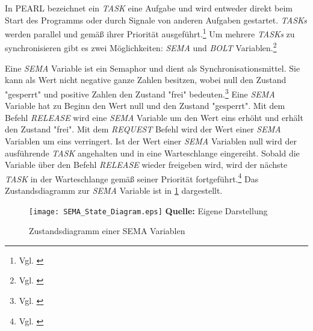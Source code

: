 In PEARL bezeichnet ein \emph{TASK} eine Aufgabe und wird entweder direkt beim
Start des Programms oder durch Signale von anderen Aufgaben gestartet.
\emph{TASKs} werden parallel und gemäß ihrer Priorität ausgeführt.\footnote{Vgl.
\autocite[104]{PEARL}} Um mehrere \emph{TASKs} zu synchronisieren gibt es zwei
Möglichkeiten: \emph{SEMA} und \emph{BOLT} Variablen.\footnote{Vgl.
\autocite[120]{PEARL}}

Eine \emph{SEMA} Variable ist ein Semaphor und dient als Synchronisationsmittel.
Sie kann als Wert nicht negative ganze Zahlen besitzen, wobei null den Zustand
"gesperrt" und positive Zahlen den Zustand "frei" bedeuten.\footnote{Vgl.
\autocite[120]{PEARL}} Eine \emph{SEMA} Variable hat zu Beginn den Wert null und
den Zustand "gesperrt". Mit dem Befehl \emph{RELEASE} wird eine \emph{SEMA}
Variable um den Wert eins erhöht und erhält den Zustand "frei". Mit dem
\emph{REQUEST} Befehl wird der Wert einer \emph{SEMA} Variablen um eins
verringert. Ist der Wert einer \emph{SEMA} Variablen null wird der ausführende
\emph{TASK} angehalten und in eine Warteschlange eingereiht. Sobald die Variable
über den Befehl \emph{RELEASE} wieder freigeben wird, wird der nächste
\emph{TASK} in der Warteschlange gemäß seiner Priorität
fortgeführt.\footnote{Vgl. \autocite[120-121]{PEARL}} Das Zustandsdiagramm zur
\emph{SEMA} Variable ist in \cref{fig:SEMA_StateDiagram} dargestellt.
\begin{figure}[ht]
  \texttt{[image: SEMA\_State\_Diagram.eps]}
  \footnotesize\sffamily\textbf{Quelle:} Eigene Darstellung
  \caption{Zustandsdiagramm einer SEMA Variablen}
  \label{fig:SEMA_StateDiagram}
\end{figure}

